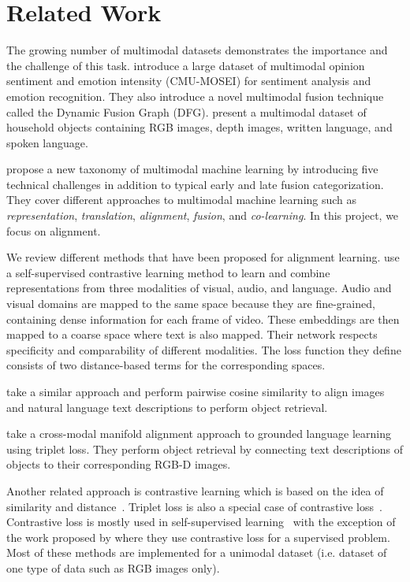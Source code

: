\documentclass[11pt]{article}
\begin{document}
\section{Related Work}
\label{sec:Related-Work}
The growing number of multimodal datasets demonstrates the importance and the challenge of this task. \citet{bagher-zadeh-etal-2018-multimodal} introduce a large dataset of multimodal opinion sentiment and emotion intensity (CMU-MOSEI) for sentiment analysis and emotion recognition. They also introduce a novel multimodal fusion technique called the Dynamic Fusion Graph (DFG).
\citet{GoLD_UMBC} present a multimodal dataset of household objects containing RGB images, depth images, written language, and spoken language.

\citet{baltrusaitisMultimodalMachineLearning2019} propose a new taxonomy of multimodal machine learning by introducing five technical challenges in addition to typical early and late fusion categorization. They cover different approaches to multimodal machine learning such as \textit{representation}, \textit{translation}, \textit{alignment}, \textit{fusion}, and \textit{co-learning}. In this project, we focus on alignment.


We review different methods that have been proposed for alignment learning.
\citet{alayrac2020self} use a self-supervised contrastive learning method to learn and combine representations from three modalities of visual, audio, and language. Audio and visual domains are mapped to the same space because they are fine-grained, containing dense information for each frame of video. These embeddings are then mapped to a coarse space where text is also mapped. Their network respects specificity and comparability of different modalities. The loss function they define consists of two distance-based terms for the corresponding spaces. 

\citet{Nguyen-RSS-20} take a similar approach and perform pairwise cosine similarity to align images and natural language text descriptions to perform object retrieval.

\citet{triplet_loss_2021_CVPR} take a cross-modal manifold alignment approach to grounded language learning using triplet loss. They perform object retrieval by connecting text descriptions of objects to their corresponding RGB-D images.

Another related approach is contrastive learning which is based on the idea of similarity and distance~\cite{NEURIPS2020_supervised_contrastive,chen2020simple}. Triplet loss is also a special case of contrastive loss~\cite{NEURIPS2020_supervised_contrastive}.
Contrastive loss is mostly used in self-supervised learning~\cite{alayrac2020self,chen2020simple} with the exception of the work proposed by \citet{NEURIPS2020_supervised_contrastive} where they use contrastive loss for a supervised problem. Most of these methods are implemented for a unimodal dataset (i.e. dataset of one type of data such as RGB images only).
\end{document}
